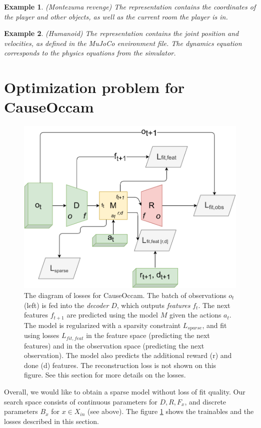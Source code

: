 \documentclass[a4paper,11pt,oneside]{report}
\newtheorem{example}{Example}[section]
\newcommand{\sysname}{CauseOccam\xspace}
\begin{document}
\begin{example}{(Montezuma revenge)}
    The representation contains the coordinates of the player and other objects, as well as the current room the player is in.
\end{example}

\begin{example}{(Humanoid)}
    The representation contains the joint position and velocities, as defined in the MuJoCo environment file. The dynamics equation corresponds to the physics equations from the simulator.
\end{example}


\section{Optimization problem for \sysname}
\begin{figure}[h]
    \centering
    \includegraphics[width=0.7\linewidth]{diagrams/architecture_losses}
    \caption{The diagram of losses for \sysname. The batch of observations $o_t$ (left) is fed into the {\em decoder} $D$, which outputs {\em features} $f_t$. The next features $f_{t+1}$ are predicted using the model $M$ given the actions $a_t$. The model is regularized with a sparsity constraint $L_{sparse}$, and fit using losses $L_{fit,feat}$ in the feature space (predicting the next features) and in the observation space (predicting the next observation). The model also predicts the additional reward (r) and done (d) features. The reconstruction loss is not shown on this figure. See this section for more details on the losses.}
    \label{fig:architecture_losses}
\end{figure}


Overall, we would like to obtain a sparse model without loss of fit quality. Our search space consists of continuous parameters for $D,R,F_x$, and discrete parameters $B_x$ for $x\in X_{in}$ (see above). The figure \ref{fig:architecture_losses} shows the trainables and the losses described in this section.
\end{document}
